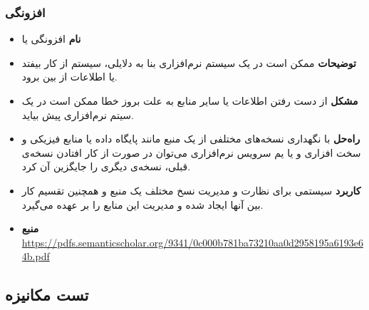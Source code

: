 \subsubsection{افزونگی}
\begin{itemize}
\item \textbf{نام} \newline
افزونگی یا 
\item \textbf{توضیحات} \newline
ممکن است در یک سیستم نرم‌افزاری بنا به دلایلی، سیستم از کار بیفتد یا اطلاعات از بین برود.
\item \textbf{مشکل} \newline
از دست رفتن اطلاعات یا سایر منابع به علت بروز خطا ممکن است در یک سیتم نرم‌افزاری پیش بیاید.
\item \textbf{راه‌حل} \newline
با نگهداری نسخه‌های مختلفی از یک منبع مانند پایگاه داده یا منابع فیزیکی و سخت افزاری و یا یم سرویس نرم‌افزاری می‌توان در صورت از کار افتادن نسخه‌ی قبلی، نسخه‌ی دیگری را جایگزین آن کرد.
\item \textbf{کاربرد} \newline
سیستمی برای نظارت و مدیریت نسخ مختلف یک منبع و همچنین تقسیم کار بین آنها ایجاد شده و مدیریت این منابع را بر عهده می‌گیرد.
\item \textbf{منبع} \newline
\url{https://pdfs.semanticscholar.org/9341/0c000b781ba73210aa0d2958195a6193e64b.pdf}
\end{itemize}

\subsection{تست مکانیزه}


